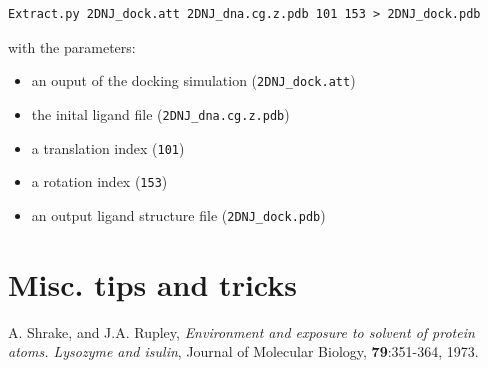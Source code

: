 \documentclass[12pt,a4paper]{article}
\begin{document}
\begin{verbatim}
Extract.py 2DNJ_dock.att 2DNJ_dna.cg.z.pdb 101 153 > 2DNJ_dock.pdb
\end{verbatim}

with the parameters:
\begin{itemize}
\item an ouput of the docking simulation ({\tt 2DNJ\_dock.att})
\item the inital ligand file ({\tt 2DNJ\_dna.cg.z.pdb})
\item a translation index ({\tt 101})
\item a rotation index ({\tt 153})
\item an output ligand structure file ({\tt 2DNJ\_dock.pdb})
\end{itemize}

\section{Misc. tips and tricks}

\begin{thebibliography}{99}

 A. Shrake, and J.A. Rupley, 
{\it Environment and exposure to solvent of protein atoms. Lysozyme and
isulin}, 
Journal of Molecular Biology, {\bf 79}:351-364, 1973.

\end{thebibliography}
\end{document}
